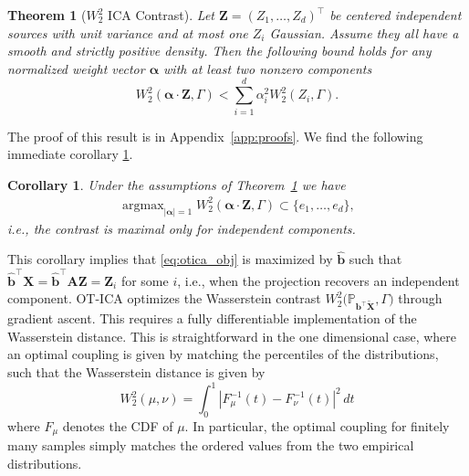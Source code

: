 \documentclass[accepted]{tpm2026} %
\newtheorem{theorem}{Theorem}
\newtheorem{corollary}{Corollary}
\newcommand{\Xb}{\mathbf{X}}
\newcommand{\Ab}{\mathbf{A}}
\newcommand{\Zb}{\mathbf{Z}}
\newcommand{\bb}{\mathbf{b}}
\newcommand{\alphab}{\mathbf{\alpha}}
\begin{document}
\begin{theorem}[$W_2^2$ ICA Contrast]\label{th:main}
Let $\mathbf{Z} = (Z_1, \dots, Z_d)^\top$ be centered independent sources with unit variance and at most one $Z_i$ Gaussian. Assume they all have a smooth and strictly positive density. Then the following bound holds for  any normalized weight vector $\mathbf{\alpha}$ with at least two nonzero components
\begin{equation}
    W_2^2(\mathbf{\alpha} \cdot \mathbf{Z}, \Gamma) < \sum_{i=1}^d \alpha_i^2 W_2^2(Z_i, \Gamma).
\end{equation}
\end{theorem}
The proof of this result is in Appendix~\ref{app:proofs}.
We find the following immediate corollary \ref{cor:max_contrast}.
\begin{corollary}\label{cor:max_contrast}
    Under the assumptions of Theorem~\ref{th:main}
    we have
    \begin{align}
        \operatorname{argmax}_{|\alphab|=1}W_2^2(\mathbf{\alpha} \cdot \mathbf{Z}, \Gamma)
        \subset \{e_1,\ldots, e_d\},
    \end{align}
    i.e., the contrast is maximal only for  independent components.
\end{corollary}
This corollary implies that
\eqref{eq:otica_obj} is maximized by $\widehat{\bb}$ such that
$\widehat{\bb}^\top \Xb=\widehat{\bb}^\top \Ab\Zb=\Zb_i$ for some $i$, i.e., when the projection recovers an independent component.
OT-ICA optimizes the Wasserstein contrast
$W_2^2\big(\mathbb{P}_{\mathbf{b}^\top \widetilde{\mathbf{X}}}, \Gamma\big)$ through gradient ascent. 
This requires a fully differentiable implementation of the Wasserstein distance. This is straightforward in the one dimensional case, where an optimal coupling is given by matching the percentiles of the distributions, such that the Wasserstein distance is given by
\begin{equation}
    W_2^2(\mu, \nu) = \int_0^1 |F_\mu^{-1}(t) - F_\nu^{-1}(t)|^2 \, dt
\end{equation}
where $F_\mu$ denotes the CDF of $\mu$. In particular, the optimal coupling for finitely many samples simply matches the ordered values from the two empirical distributions.


\end{document}
